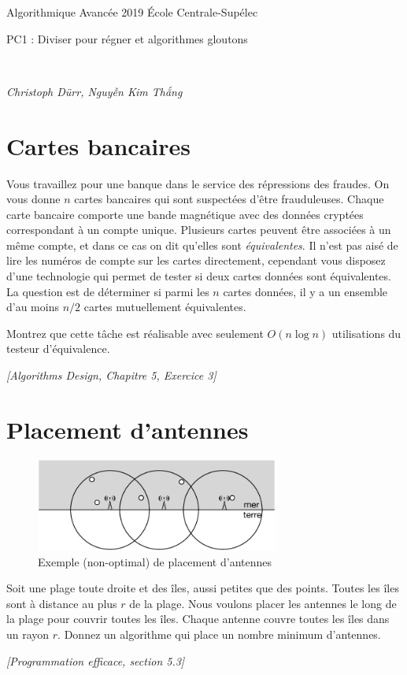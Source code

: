 \documentclass[12pt]{article}
\newcommand{\source}[1]{\begin{flushright}\emph{[#1]}\end{flushright}}
\newcommand{\MakeScribeTop}[1]{
\noindent
\begin{framed}
\noindent
 Algorithmique Avancée 2019
 \hfill
 École Centrale-Supélec
 \\[1em]
 \centerline{ \Large
#1
 }
 \\[1em]
\centerline{  \it Christoph Dürr, Nguyễn Kim Thắng}
\end{framed}
}
\begin{document}
    \MakeScribeTop{PC1 : Diviser pour régner et algorithmes gloutons}

    \section{Cartes bancaires}



    Vous travaillez pour une banque dans le service des répressions des fraudes.  On vous donne $n$ cartes bancaires qui sont suspectées d'être frauduleuses. Chaque carte bancaire comporte une bande magnétique avec des données cryptées correspondant à un compte unique. Plusieurs cartes peuvent être associées à un même compte, et dans ce cas on dit qu'elles sont \emph{équivalentes}.
    Il n'est pas aisé de lire les numéros de compte sur les cartes directement, cependant
    vous disposez d'une technologie qui permet de tester si deux cartes données sont équivalentes.
    La question est de déterminer si parmi les $n$ cartes données, il y a un ensemble d'au moins $n/2$ cartes mutuellement équivalentes.

    Montrez que cette tâche est réalisable avec seulement $O(n \log n)$ utilisations du testeur d'équivalence.

\source{Algorithms Design, Chapitre 5, Exercice 3}

    \section{Placement d'antennes}


\begin{figure}[h]
\centerline{\includegraphics[width=8cm]{radar-disc}}
\caption{Exemple (non-optimal) de placement d'antennes}
\end{figure}

Soit une plage toute droite et des îles, aussi petites que des points.
Toutes les îles sont à distance au plus $r$ de la plage.
Nous voulons placer les antennes le long de la plage pour couvrir toutes les îles.
Chaque antenne couvre toutes les îles dans un rayon $r$.
Donnez un algorithme qui place un nombre minimum d'antennes.

\source{Programmation efficace, section 5.3}
\end{document}
